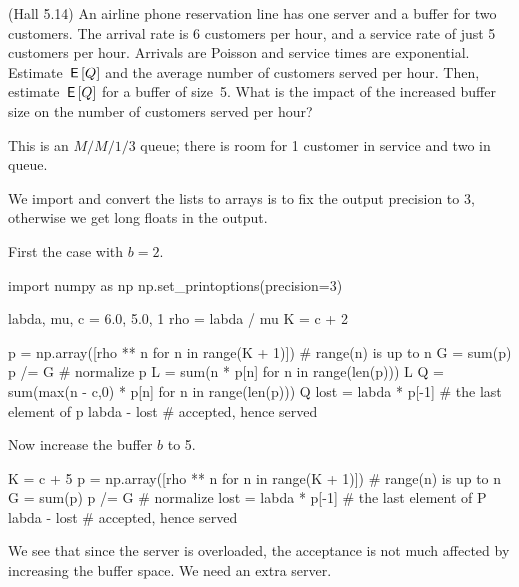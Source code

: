 \begin{exercise}
 (Hall 5.14) An airline phone reservation line has one server and a buffer for two customers.
 The arrival rate is 6 customers per hour, and a service rate of just 5 customers per hour.
 Arrivals are Poisson and service times are exponential.
 Estimate $\,\mathsf{E}\left[Q\right]$ and the average number of customers served per hour.
 Then, estimate $\,\mathsf{E}\left[Q\right]$ for a buffer of size~5.
 What is the impact of the increased buffer size on the number of customers served per hour?
\begin{hint}
This is an $M/M/1/3$ queue; there is room for 1 customer in service and two in queue.
\end{hint}
\begin{solution}
We import  and convert the lists to arrays is to fix the output precision to 3, otherwise we get long floats in the output.

First the case with $b=2$. 
\begin{pyconsole}
import numpy as np
np.set_printoptions(precision=3)

labda, mu, c = 6.0,  5.0, 1
rho = labda / mu
K = c + 2


p = np.array([rho ** n for n in range(K + 1)]) # range(n) is up to n
G = sum(p)
p /= G  # normalize
p
L = sum(n * p[n] for n in range(len(p)))
L
Q = sum(max(n - c,0) * p[n] for n in range(len(p)))
Q
lost = labda * p[-1]  # the last element of p
labda - lost # accepted, hence served
\end{pyconsole} 

Now increase the buffer $b$ to 5.

\begin{pyconsole}
K = c + 5
p = np.array([rho ** n for n in range(K + 1)]) # range(n) is up to n
G = sum(p)
p /= G  # normalize
lost = labda * p[-1]  # the last element of P
labda - lost # accepted, hence served
\end{pyconsole} 
We see that since the server is overloaded, the acceptance is not much affected by increasing the buffer space.
We need an extra server.
\end{solution}
\end{exercise}


